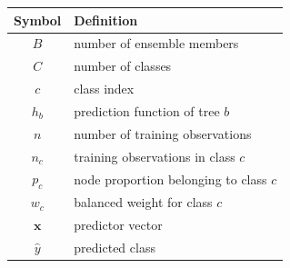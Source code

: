 \documentclass[conference]{IEEEtran}
\begin{document}
\begin{table}[ht]
\centering
\begin{tabular}{cl}
\toprule
Symbol & Definition\\
\midrule
$B$ & number of ensemble members\\
$C$ & number of classes\\
$c$ & class index\\
$h_b$ & prediction function of tree $b$\\
$n$ & number of training observations\\
$n_c$ & training observations in class $c$\\
$p_c$ & node proportion belonging to class $c$\\
$w_c$ & balanced weight for class $c$\\
$\boldsymbol{x}$ & predictor vector\\
$\hat{y}$ & predicted class\\
\bottomrule
\end{tabular}
\end{table}
\end{document}
